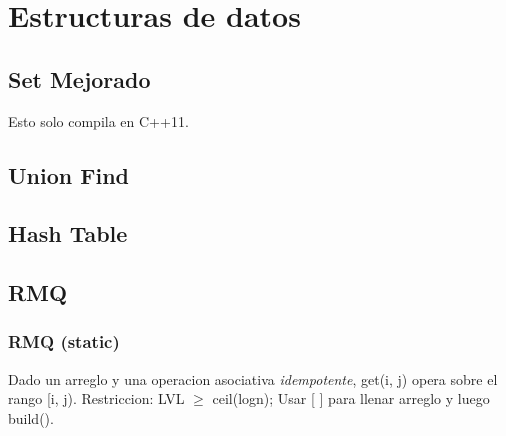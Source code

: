 \newpage
\section{Estructuras de datos}

\subsection{Set Mejorado}
Esto solo compila en C++11.


\subsection{Union Find}
% 
% 


\newpage
\subsection{Hash Table}


\subsection{RMQ}
\subsubsection{RMQ (static)}
Dado un arreglo y una operacion asociativa \emph{idempotente}, get(i, j) opera sobre el rango [i, j). Restriccion: LVL $\ge$ ceil(logn); Usar [ ] para llenar arreglo y luego build().

